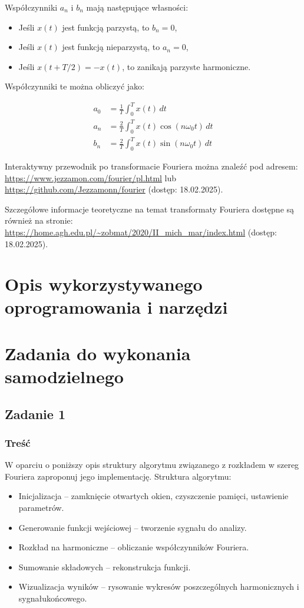 Współczynniki $a_n$ i $b_n$ mają następujące własności:
\begin{itemize}
	\item Jeśli $x(t)$ jest funkcją parzystą, to $b_n = 0$,
	\item Jeśli $x(t)$ jest funkcją nieparzystą, to $a_n = 0$,
	\item Jeśli $x(t + T/2) = -x(t)$, to zanikają parzyste harmoniczne.
\end{itemize}

Współczynniki te można obliczyć jako:

\begin{align}
	a_0 &= \frac{1}{T} \int_0^T x(t) \,dt \\
	a_n &= \frac{2}{T} \int_0^T x(t) \cos(n\omega_0 t) \,dt \\
	b_n &= \frac{2}{T} \int_0^T x(t) \sin(n\omega_0 t) \,dt
\end{align}

Interaktywny przewodnik po transformacie Fouriera można znaleźć pod adresem: 
\url{https://www.jezzamon.com/fourier/pl.html} lub \url{https://github.com/Jezzamonn/fourier} (dostęp: 18.02.2025). 

Szczegółowe informacje teoretyczne na temat transformaty Fouriera dostępne są również na stronie: 
\url{https://home.agh.edu.pl/~zobmat/2020/II_mich_mar/index.html} (dostęp: 18.02.2025).


\section{Opis wykorzystywanego oprogramowania i narzędzi}


\section{Zadania do wykonania samodzielnego}

\subsection{Zadanie 1}

\subsubsection{Treść}

W oparciu o poniższy opis struktury algorytmu związanego z rozkładem w szereg Fouriera zaproponuj
jego implementację. Struktura algorytmu:

\begin{itemize}
	\item Inicjalizacja – zamknięcie otwartych okien, czyszczenie pamięci, ustawienie parametrów.
 	\item Generowanie funkcji wejściowej – tworzenie sygnału do analizy.
	\item Rozkład na harmoniczne – obliczanie współczynników Fouriera.
	\item Sumowanie składowych – rekonstrukcja funkcji.	
	\item Wizualizacja wyników – rysowanie wykresów poszczególnych harmonicznych i sygnałukońcowego.
\end{itemize}


